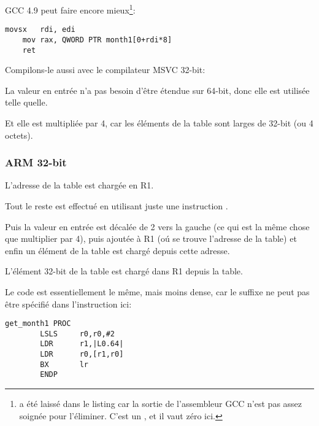 GCC 4.9 \Optimizing peut faire encore mieux\footnote{ a été laissé dans le
listing car la sortie de l'assembleur GCC n'est pas assez soignée pour l'éliminer.
C'est un , et il vaut zéro ici.}:

\begin{lstlisting}[caption=GCC 4.9 \Optimizing x64,style=customasmx86]
	movsx	rdi, edi
	mov	rax, QWORD PTR month1[0+rdi*8]
	ret
\end{lstlisting}


Compilons-le aussi avec le compilateur MSVC 32-bit:



La valeur en entrée n'a pas besoin  d'être étendue sur 64-bit, donc elle est utilisée
telle quelle.

Et elle est multipliée par 4, car les éléments de la table sont larges de 32-bit
(ou 4 octets).

\subsubsection{ARM 32-bit}





L'adresse de la table est chargée en R1.

Tout le reste est effectué en utilisant juste une instruction \LDR.

Puis la valeur en entrée est décalée de 2 vers la gauche (ce qui est la même chose
que multiplier par 4), puis ajoutée à R1 (oú se trouve l'adresse de la table) et
enfin un élément de la table est chargé depuis cette adresse.

L'élément 32-bit de la table est chargé dans R1 depuis la table.


Le code est essentiellement le même, mais moins dense, car le suffixe \LSL ne peut
pas être spécifié dans l'instruction \LDR ici:

\begin{lstlisting}[style=customasmARM]
get_month1 PROC
        LSLS     r0,r0,#2
        LDR      r1,|L0.64|
        LDR      r0,[r1,r0]
        BX       lr
        ENDP
\end{lstlisting}

